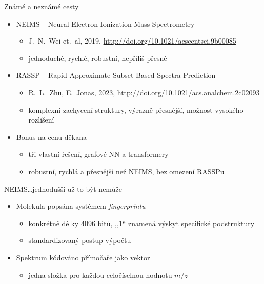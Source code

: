 \documentclass[aspectratio=169]{beamer}
\begin{document}
\begin{frame}
{Známé a neznámé cesty}
\begin{itemize}
\item NEIMS -- Neural Electron-Ionization Mass Spectrometry
\begin{itemize}
\item J.~N.~Wei et.~al, 2019, \url{http://doi.org/10.1021/acscentsci.9b00085}
\item jednoduché, rychlé, robustní, nepříliš přesné
\end{itemize}
\medskip
\item RASSP -- Rapid Approximate Subset-Based Spectra Prediction 
\begin{itemize}
\item R.~L.~Zhu, E.~Jonas, 2023, \url{http://doi.org/10.1021/acs.analchem.2c02093}
\item komplexní zachycení struktury, výrazně přesnější, možnost vysokého rozlišení
\end{itemize}
\medskip\pause
\item Bonus na cenu děkana
\begin{itemize}
\item tři vlastní řešení, grafové NN a transformery
\item robustní, rychlá a přesnější než NEIMS, bez omezení RASSPu
\end{itemize}


\end{itemize}
\end{frame}

\begin{frame}
{NEIMS}{\dots jednodušší už to být nemůže}
\begin{itemize}
\item Molekula popsána systémem \emph{fingerprintu}
\begin{itemize}
\item konkrétně délky 4096 bitů, ,,1`` znamená výskyt specifické podstruktury
\item standardizovaný postup výpočtu
\end{itemize}
\item Spektrum kódováno přímočaře jako vektor
\begin{itemize}
\item jedna složka pro každou celočíselnou hodnotu $m/z$
\end{itemize}
\end{itemize}
\end{frame}
\end{document}
